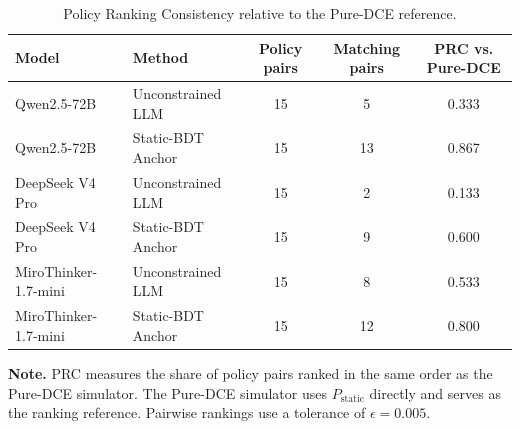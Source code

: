 \begin{table}[t]
\centering
\caption{Policy Ranking Consistency relative to the Pure-DCE reference.}
\label{tab:prc}
\begin{tabular}{l l c c c}
\toprule
Model & Method & Policy pairs & Matching pairs & PRC vs. Pure-DCE \\
\midrule
Qwen2.5-72B & Unconstrained LLM & 15 & 5 & 0.333 \\
Qwen2.5-72B & Static-BDT Anchor & 15 & 13 & 0.867 \\
DeepSeek V4 Pro & Unconstrained LLM & 15 & 2 & 0.133 \\
DeepSeek V4 Pro & Static-BDT Anchor & 15 & 9 & 0.600 \\
MiroThinker-1.7-mini & Unconstrained LLM & 15 & 8 & 0.533 \\
MiroThinker-1.7-mini & Static-BDT Anchor & 15 & 12 & 0.800 \\
\bottomrule
\end{tabular}
\vspace{0.4em}
\begin{minipage}{0.90\textwidth}
\small
\textbf{Note.} PRC measures the share of policy pairs ranked in the same order as the Pure-DCE simulator. The Pure-DCE simulator uses \(P_{\mathrm{static}}\) directly and serves as the ranking reference. Pairwise rankings use a tolerance of \(\epsilon=0.005\).
\end{minipage}
\end{table}
